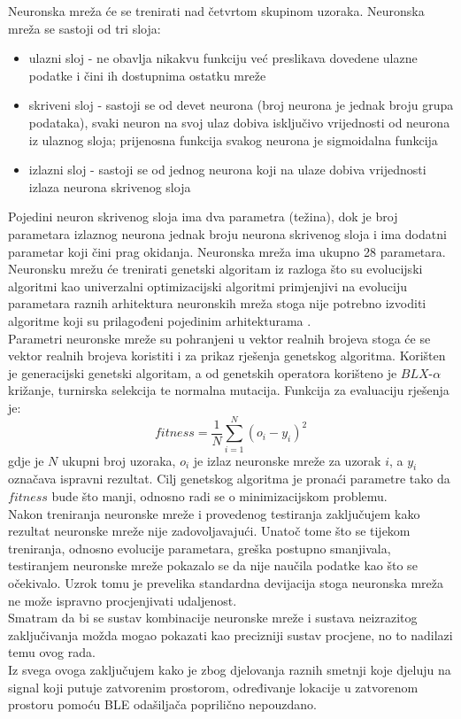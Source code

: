 Neuronska mreža će se trenirati nad četvrtom skupinom uzoraka. 
Neuronska mreža se sastoji od tri sloja:
\begin{itemize}
 \item ulazni sloj - ne obavlja nikakvu funkciju već preslikava dovedene ulazne podatke i čini ih dostupnima ostatku mreže
 \item skriveni sloj - sastoji se od devet neurona (broj neurona je jednak broju grupa podataka), svaki neuron na svoj ulaz dobiva isključivo vrijednosti od neurona iz ulaznog sloja; prijenosna funkcija svakog neurona je sigmoidalna funkcija
 \item izlazni sloj - sastoji se od jednog neurona koji na ulaze dobiva vrijednosti izlaza neurona skrivenog sloja
\end{itemize}
Pojedini neuron skrivenog sloja ima dva parametra (težina), dok je broj parametara izlaznog neurona jednak broju neurona skrivenog sloja i ima dodatni parametar koji čini prag okidanja. 
Neuronska mreža ima ukupno 28 parametara.
\\

Neuronsku mrežu će trenirati genetski algoritam iz razloga što su evolucijski algoritmi kao univerzalni optimizacijski algoritmi primjenjivi na evoluciju parametara raznih arhitektura neuronskih mreža stoga nije potrebno izvoditi algoritme koji su prilagođeni pojedinim arhitekturama \citep{nenr}.
\\
Parametri neuronske mreže su pohranjeni u vektor realnih brojeva stoga će se vektor realnih brojeva koristiti i za prikaz rješenja genetskog algoritma. 
Korišten je generacijski genetski algoritam, a od genetskih operatora korišteno je $BLX\text{-}\alpha$ križanje, turnirska selekcija te normalna mutacija. 
Funkcija za evaluaciju rješenja je:
\begin{equation}
    fitness = \frac{1}{N}\sum_{i=1}^{N}{(o_i - y_i)^2}
\end{equation}
gdje je $N$ ukupni broj uzoraka, $o_i$ je izlaz neuronske mreže za uzorak $i$, a $y_i$ označava ispravni rezultat. 
Cilj genetskog algoritma je pronaći parametre tako da $fitness$ bude što manji, odnosno radi se o minimizacijskom problemu.
\\

Nakon treniranja neuronske mreže i provedenog testiranja zaključujem kako rezultat neuronske mreže nije zadovoljavajući. 
Unatoč tome što se tijekom treniranja, odnosno evolucije parametara, greška postupno smanjivala, testiranjem neuronske mreže pokazalo se da nije naučila podatke kao što se očekivalo. 
Uzrok tomu je prevelika standardna devijacija stoga neuronska mreža ne može ispravno procjenjivati udaljenost.
\\
Smatram da bi se sustav kombinacije neuronske mreže i sustava neizrazitog zaključivanja možda mogao pokazati kao precizniji sustav procjene, no to nadilazi temu ovog rada.
\\
Iz svega ovoga zaključujem kako je zbog djelovanja raznih smetnji koje djeluju na signal koji putuje zatvorenim prostorom, određivanje lokacije u zatvorenom prostoru pomoću BLE odašiljača poprilično nepouzdano.

